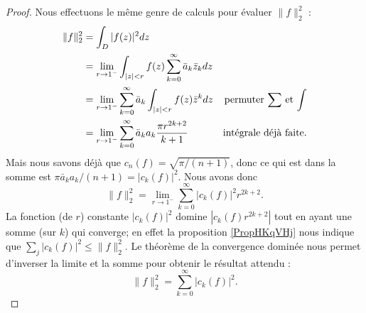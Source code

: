 \begin{proof}
    Nous effectuons le même genre de calculs pour évaluer \( \| f \|^2_2\) :
    \begin{subequations}
        \begin{align}
            \| f \|_2^2&=\int_D| f(z) |^2dz\\
            &=\lim_{r\to 1^-}\int_{| z |<r}f(z)\sum_{k=0}^{\infty}\bar a_k\bar z_kdz\\
            &=\lim_{r\to 1^-}\sum_{k=0}^{\infty}\bar a_k\int_{| z |<r}f(z)\bar z^kdz&\text{permuter \( \sum\) et \( \int\)}\\
            &=\lim_{r\to 1^-}\sum_{k=0}^{\infty}\bar a_ka_k\frac{ \pi r^{2k+2} }{ k+1 }&\text{intégrale déjà faite}.
        \end{align}
    \end{subequations}
    Mais nous savons déjà que \( c_n(f)=\sqrt{\pi/(n+1)}\), donc ce qui est dans la somme est \( \pi\bar a_ka_k/(n+1)=| c_k(f) |^2\). Nous avons donc
    \begin{equation}
        \| f \|^2_2=\lim_{r\to 1^-}\sum_{k=0}^{\infty}| c_k(f) |^2 r^{2k+2}.
    \end{equation}
    La fonction (de \( r\)) constante \( | c_k(f) |^2\) domine \( | c_k(f)r^{2k+2} |\) tout en ayant une somme (sur \( k\)) qui converge; en effet la proposition \ref{PropHKqVHj} nous indique que \( \sum_j| c_k(f) |^2\leq \| f \|_2^2\). Le théorème de la convergence dominée nous permet d'inverser la limite et la somme pour obtenir le résultat attendu :
    \begin{equation}
        \| f \|_2^2=\sum_{k=0}^{\infty}| c_k(f) |^2.
    \end{equation}
\end{proof}


